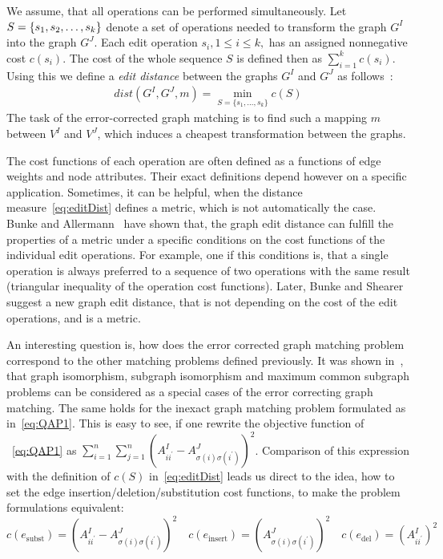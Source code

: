We assume, that all operations can be performed simultaneously. Let $S=\{s_1,s_2,\dots,\newline s_k\}$ denote a set of operations needed to transform the graph $G^I$ into the graph $G^J$. 
Each edit operation $s_i, 1\le i\le k,$ has an assigned nonnegative cost $c(s_i)$. The cost of the whole sequence $S$ is defined then as $\sum_{i=1}^{k}c(s_i)$. Using this we define a \emph{edit distance} between the graphs $G^I$ and $G^J$ as follows~\cite{Bunke1983_inexactGM, Wang1995}:
\begin{eqnarray} \label{eq:editDist}
dist(G^I,G^J,m) = \min\limits_{S=\{s_1,\dots,s_k\}}c(S)
\end{eqnarray}
The task of the error-corrected graph matching is to find such a mapping $m$ between $V^I$ and $V^J$, which induces a cheapest transformation between the graphs.

The cost functions of each operation are often defined as a functions of edge weights and node attributes. Their exact definitions depend however on a specific application. Sometimes, it can be helpful, when the distance measure~\eqref{eq:editDist} defines a metric, which is not automatically the case. Bunke and Allermann~\cite{Bunke1983_inexactGM} have shown that, the graph edit distance can fulfill the properties of a metric under a specific conditions on the cost functions of the individual edit operations. For example, one if this conditions is, that a single operation is always preferred to a sequence of two operations with the same result (triangular inequality of the operation cost functions). Later, Bunke and Shearer~\cite{Bunke1998_graphDist} suggest a new graph edit distance, that is not depending on the cost of the edit operations, and is a metric.

An interesting question is, how does the error corrected graph matching problem correspond to the other matching problems defined previously. It was shown in~\cite{Bunke1999_UnderlyingCosts}, that graph isomorphism, subgraph isomorphism and maximum common subgraph problems can be considered as a special cases of the error correcting graph matching. The same holds for the inexact graph matching problem formulated as in~\eqref{eq:QAP1}. This is easy to see, if one rewrite the objective function of ~\eqref{eq:QAP1} as $\sum_{i=1}^n\sum_{j=1}^{n}(A^I_{ii^\prime}-A^J_{\sigma(i)\sigma(i^\prime)})^2$. Comparison of this expression with the definition of $c(S)$ in~\eqref{eq:editDist} leads us direct to the idea, how to set the edge insertion/deletion/substitution cost functions, to make the problem formulations equivalent: 
\begin{equation*}
c(e_{\text{subst}})=(A^I_{ii^\prime}-A^J_{\sigma(i)\sigma(i^\prime)})^2\quad c(e_{\text{insert}})=(A^J_{\sigma(i)\sigma(i^\prime)})^2\quad c(e_{\text{del}})=(A^I_{ii^\prime})^2
\end{equation*}
